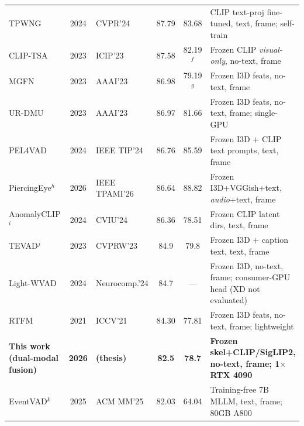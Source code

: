 \begin{table}[t]
\begin{tabular}{l c l c c l}
TPWNG                      & 2024 & CVPR'24           & 87.79 & 83.68 & CLIP text-proj fine-tuned, text, frame; self-train \\
CLIP-TSA                   & 2023 & ICIP'23           & 87.58 & 82.19$^{f}$ & Frozen CLIP \emph{visual-only}, no-text, frame \\ %
MGFN                       & 2023 & AAAI'23           & 86.98 & 79.19$^{g}$ & Frozen I3D feats, no-text, frame \\ %
UR-DMU                     & 2023 & AAAI'23           & 86.97 & 81.66 & Frozen I3D feats, no-text, frame; single-GPU \\
PEL4VAD                    & 2024 & IEEE TIP'24       & 86.76 & 85.59 & Frozen I3D + CLIP text prompts, text, frame \\
PiercingEye$^{h}$          & 2026 & IEEE TPAMI'26     & 86.64 & 88.82 & Frozen I3D+VGGish+text, \emph{audio}+text, frame \\ %
AnomalyCLIP$^{i}$          & 2024 & CVIU'24           & 86.36 & 78.51 & Frozen CLIP latent dirs, text, frame \\ %
TEVAD$^{j}$                & 2023 & CVPRW'23          & 84.9  & 79.8  & Frozen I3D + caption text, text, frame \\ %
Light-WVAD                 & 2024 & Neurocomp.'24     & 84.7  & ---   & Frozen I3D, no-text, frame; consumer-GPU head (XD not evaluated) \\
RTFM                       & 2021 & ICCV'21           & 84.30 & 77.81 & Frozen I3D feats, no-text, frame; lightweight \\
\textbf{This work (dual-modal fusion)} & \textbf{2026} & \textbf{(thesis)} & \textbf{82.5} & \textbf{78.7} & \textbf{Frozen skel+CLIP/SigLIP2, no-text, frame; 1$\times$RTX 4090} \\
EventVAD$^{k}$             & 2025 & ACM MM'25         & 82.03 & 64.04 & Training-free 7B MLLM, text, frame; 80GB A800 \\ %

\end{tabular}
\end{table}
